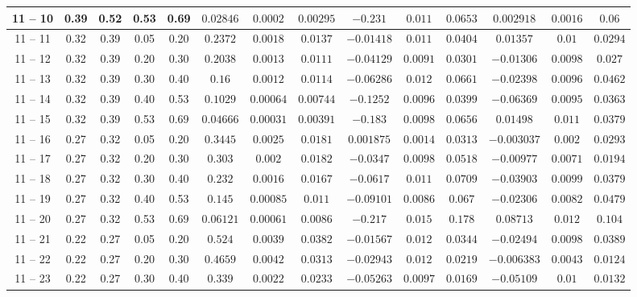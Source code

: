\begin{longtable}{|*{14}{c|}}
\hline
11 -- 10 & 0.39 & 0.52 & 0.53 & 0.69 & $0.02846$ & $0.0002$ & $0.00295$ & $-0.231$ & $0.011$ & $0.0653$ & $0.002918$ & $0.0016$ & $0.06$ \\
\hline
11 -- 11 & 0.32 & 0.39 & 0.05 & 0.20 & $0.2372$ & $0.0018$ & $0.0137$ & $-0.01418$ & $0.011$ & $0.0404$ & $0.01357$ & $0.01$ & $0.0294$ \\
\hline
11 -- 12 & 0.32 & 0.39 & 0.20 & 0.30 & $0.2038$ & $0.0013$ & $0.0111$ & $-0.04129$ & $0.0091$ & $0.0301$ & $-0.01306$ & $0.0098$ & $0.027$ \\
\hline
11 -- 13 & 0.32 & 0.39 & 0.30 & 0.40 & $0.16$ & $0.0012$ & $0.0114$ & $-0.06286$ & $0.012$ & $0.0661$ & $-0.02398$ & $0.0096$ & $0.0462$ \\
\hline
11 -- 14 & 0.32 & 0.39 & 0.40 & 0.53 & $0.1029$ & $0.00064$ & $0.00744$ & $-0.1252$ & $0.0096$ & $0.0399$ & $-0.06369$ & $0.0095$ & $0.0363$ \\
\hline
11 -- 15 & 0.32 & 0.39 & 0.53 & 0.69 & $0.04666$ & $0.00031$ & $0.00391$ & $-0.183$ & $0.0098$ & $0.0656$ & $0.01498$ & $0.011$ & $0.0379$ \\
\hline
11 -- 16 & 0.27 & 0.32 & 0.05 & 0.20 & $0.3445$ & $0.0025$ & $0.0181$ & $0.001875$ & $0.0014$ & $0.0313$ & $-0.003037$ & $0.002$ & $0.0293$ \\
\hline
11 -- 17 & 0.27 & 0.32 & 0.20 & 0.30 & $0.303$ & $0.002$ & $0.0182$ & $-0.0347$ & $0.0098$ & $0.0518$ & $-0.00977$ & $0.0071$ & $0.0194$ \\
\hline
11 -- 18 & 0.27 & 0.32 & 0.30 & 0.40 & $0.232$ & $0.0016$ & $0.0167$ & $-0.0617$ & $0.011$ & $0.0709$ & $-0.03903$ & $0.0099$ & $0.0379$ \\
\hline
11 -- 19 & 0.27 & 0.32 & 0.40 & 0.53 & $0.145$ & $0.00085$ & $0.011$ & $-0.09101$ & $0.0086$ & $0.067$ & $-0.02306$ & $0.0082$ & $0.0479$ \\
\hline
11 -- 20 & 0.27 & 0.32 & 0.53 & 0.69 & $0.06121$ & $0.00061$ & $0.0086$ & $-0.217$ & $0.015$ & $0.178$ & $0.08713$ & $0.012$ & $0.104$ \\
\hline
11 -- 21 & 0.22 & 0.27 & 0.05 & 0.20 & $0.524$ & $0.0039$ & $0.0382$ & $-0.01567$ & $0.012$ & $0.0344$ & $-0.02494$ & $0.0098$ & $0.0389$ \\
\hline
11 -- 22 & 0.22 & 0.27 & 0.20 & 0.30 & $0.4659$ & $0.0042$ & $0.0313$ & $-0.02943$ & $0.012$ & $0.0219$ & $-0.006383$ & $0.0043$ & $0.0124$ \\
\hline
11 -- 23 & 0.22 & 0.27 & 0.30 & 0.40 & $0.339$ & $0.0022$ & $0.0233$ & $-0.05263$ & $0.0097$ & $0.0169$ & $-0.05109$ & $0.01$ & $0.0132$ \\

\end{longtable}
